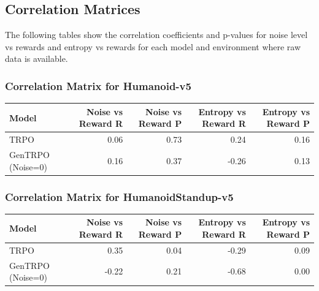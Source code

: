 \documentclass{svproc}
\begin{document}
\begin{table}[htbp]
\centering
\caption{Detailed Metrics for All Model-Environment Pairs}
\end{table}
\subsection{Correlation Matrices}
The following tables show the correlation coefficients and p-values for noise level vs rewards and entropy vs rewards for each model and environment where raw data is available.

\subsubsection{Correlation Matrix for Humanoid-v5}
\begin{tabular}{lrrrr}
\toprule
Model & Noise vs Reward R & Noise vs Reward P & Entropy vs Reward R & Entropy vs Reward P \\
\midrule
TRPO & 0.06 & 0.73 & 0.24 & 0.16 \\
GenTRPO (Noise=0) & 0.16 & 0.37 & -0.26 & 0.13 \\
\bottomrule
\end{tabular}


\subsubsection{Correlation Matrix for HumanoidStandup-v5}
\begin{tabular}{lrrrr}
\toprule
Model & Noise vs Reward R & Noise vs Reward P & Entropy vs Reward R & Entropy vs Reward P \\
\midrule
TRPO & 0.35 & 0.04 & -0.29 & 0.09 \\
GenTRPO (Noise=0) & -0.22 & 0.21 & -0.68 & 0.00 \\
\bottomrule
\end{tabular}
\end{document}
